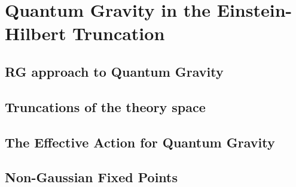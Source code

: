 \chapter{Quantum Gravity in the Einstein-Hilbert Truncation}
\section{RG approach to Quantum Gravity}

\blindtext

\section{Truncations of the theory space}

\blindtext

\section{The Effective Action for Quantum Gravity}

\blindtext

\section{Non-Gaussian Fixed Points}